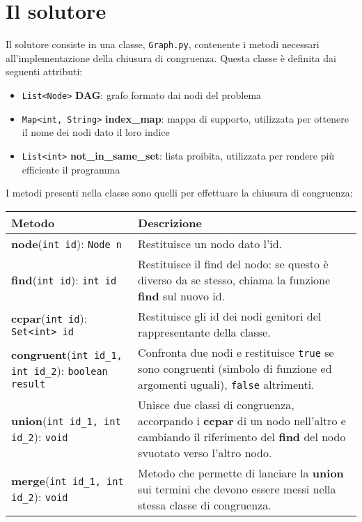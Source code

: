 \section{Il solutore}
Il solutore consiste in una classe, \texttt{Graph.py}, contenente i metodi necessari all'implementazione
della chiusura di congruenza. Questa classe è definita dai seguenti attributi:
\begin{itemize}
    \item \texttt{List<Node>} \textbf{DAG}: grafo formato dai nodi del problema
    \item \texttt{Map<int, String>} \textbf{index\_map}: mappa di supporto, utilizzata per ottenere il nome dei nodi dato
                                                        il loro indice
    \item \texttt{List<int>} \textbf{not\_in\_same\_set}: lista proibita, utilizzata per rendere più efficiente il programma
\end{itemize}
I metodi presenti nella classe sono quelli per effettuare la chiusura di congruenza:
\begin{center}
    \label{tab:methods}
    \begin{tabular}{|m{6cm}|m{6cm}|}
        \hline
        \textbf{Metodo} & \textbf{Descrizione} \\ \hline
         \textbf{node}(\texttt{int id}): \texttt{Node n} & Restituisce un nodo dato l'id. \\ \hline
         \textbf{find}(\texttt{int id}): \texttt{int id} & Restituisce il find del nodo: se questo è diverso
                    da se stesso, chiama la funzione \textbf{find} sul nuovo id. \\ \hline
         \textbf{ccpar}(\texttt{int id}): \texttt{Set<int> id} & Restituisce gli id dei nodi genitori del rappresentante
                    della classe. \\ \hline
        \textbf{congruent}(\texttt{int id\_1, int id\_2}): \texttt{boolean result} & Confronta due nodi e restituisce
                    \texttt{true} se sono congruenti (simbolo di funzione ed argomenti uguali),
                    \texttt{false} altrimenti. \\ \hline
        \textbf{union}(\texttt{int id\_1, int id\_2}): \texttt{void} & Unisce due classi di congruenza,
                    accorpando i \textbf{ccpar} di un nodo nell'altro e cambiando il riferimento del \textbf{find} del
                    nodo svuotato verso l'altro nodo. \\ \hline
        \textbf{merge}(\texttt{int id\_1, int id\_2}): \texttt{void} & Metodo che permette di lanciare la \textbf{union}
                    sui termini che devono essere messi nella stessa classe di congruenza. \\ \hline
    \end{tabular}
\end{center}

